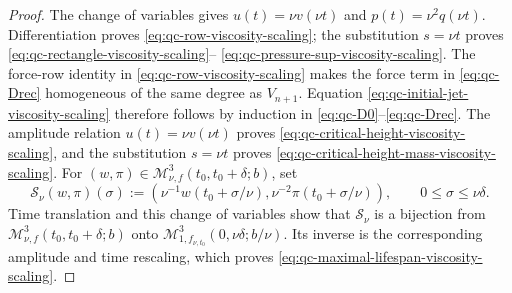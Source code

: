\begin{proof}
The change of variables gives
\(u(t)=\nu v(\nu t)\) and \(p(t)=\nu^2q(\nu t)\).
Differentiation proves \eqref{eq:qc-row-viscosity-scaling}; the substitution
\(s=\nu t\) proves
\eqref{eq:qc-rectangle-viscosity-scaling}--%
\eqref{eq:qc-pressure-sup-viscosity-scaling}.
The force-row identity in \eqref{eq:qc-row-viscosity-scaling} makes the
force term in \eqref{eq:qc-Drec} homogeneous of the same degree as
\(V_{n+1}\).  Equation \eqref{eq:qc-initial-jet-viscosity-scaling} therefore
follows by induction in \eqref{eq:qc-D0}--\eqref{eq:qc-Drec}.  The amplitude relation
\(u(t)=\nu v(\nu t)\) proves
\eqref{eq:qc-critical-height-viscosity-scaling}, and the substitution
\(s=\nu t\) proves
\eqref{eq:qc-critical-height-mass-viscosity-scaling}.  For
\((w,\pi)\in\mathscr M_{\nu,f}^3(t_0,t_0+\delta;b)\), set
\[
 \mathcal S_\nu(w,\pi)(\sigma)
 :=
 \left(
  \nu^{-1}w(t_0+\sigma/\nu),
  \nu^{-2}\pi(t_0+\sigma/\nu)
 \right),
 \qquad 0\le\sigma\le\nu\delta.
\]
Time translation and this change of variables show that
\(\mathcal S_\nu\) is a bijection from
\(\mathscr M_{\nu,f}^3(t_0,t_0+\delta;b)\) onto
\(\mathscr M_{1,f_{\nu,t_0}}^3(0,\nu\delta;b/\nu)\).
Its inverse is the corresponding amplitude and time rescaling,
which proves \eqref{eq:qc-maximal-lifespan-viscosity-scaling}.
\end{proof}

